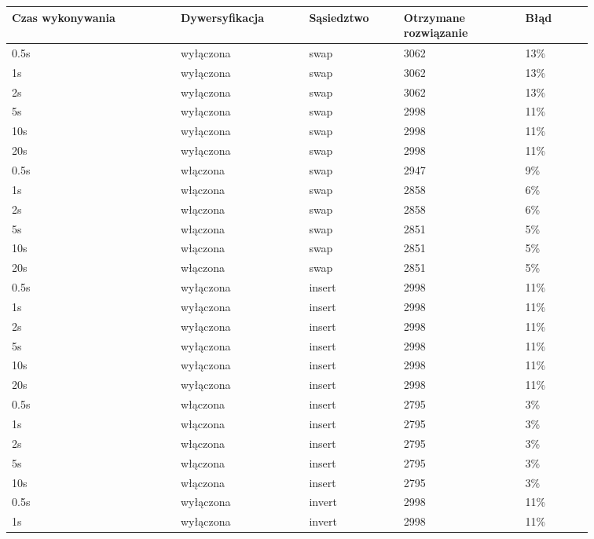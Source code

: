 \documentclass[12pt,a4paper,titlepage]{article}
\begin{document}
\begin{table}[H]
    \centering
	{\begin{tabular}{|p{0.25\linewidth}p{0.19\linewidth}p{0.14\linewidth}p{0.18\linewidth}p{0.1\linewidth}|}
		\hline
        Czas wykonywania & Dywersyfikacja & Sąsiedztwo & Otrzymane rozwiązanie & Błąd \\
		\hline
        0.5s & wyłączona & swap & 3062 & 13\% \\
        1s & wyłączona & swap & 3062 & 13\% \\
        2s & wyłączona & swap & 3062 & 13\% \\
        5s & wyłączona & swap & 2998 & 11\% \\
        10s & wyłączona & swap & 2998 & 11\% \\
        20s & wyłączona & swap & 2998 & 11\% \\
        \hline
        0.5s & włączona & swap & 2947 & 9\% \\
        1s & włączona & swap & 2858 & 6\% \\
        2s & włączona & swap & 2858 & 6\% \\
        5s & włączona & swap & 2851 & 5\% \\
        10s & włączona & swap & 2851 & 5\% \\
        20s & włączona & swap & 2851 & 5\% \\
		\hline
		0.5s & wyłączona & insert & 2998 & 11\% \\
        1s & wyłączona & insert & 2998 & 11\% \\
        2s & wyłączona & insert & 2998 & 11\% \\
        5s & wyłączona & insert & 2998 & 11\% \\
        10s & wyłączona & insert & 2998 & 11\% \\
        20s & wyłączona & insert & 2998 & 11\% \\
        \hline
        0.5s & włączona & insert & 2795 & 3\% \\
        1s & włączona & insert & 2795 & 3\% \\
        2s & włączona & insert & 2795 & 3\% \\
        5s & włączona & insert & 2795 & 3\% \\
        10s & włączona & insert & 2795 & 3\% \\
        		\hline
		0.5s & wyłączona & invert & 2998 & 11\% \\
        1s & wyłączona & invert & 2998 & 11\% \\

\end{tabular}}
\end{table}
\end{document}
